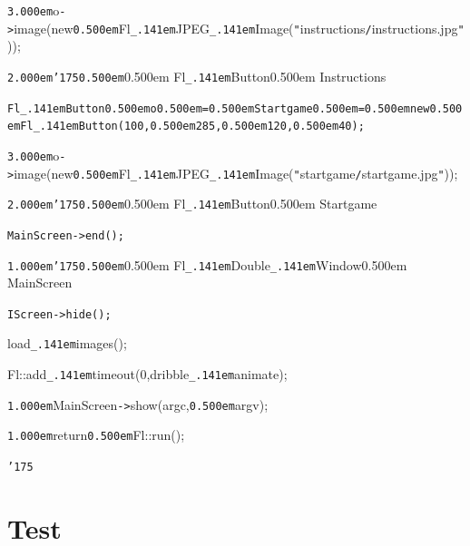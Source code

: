 \documentclass[12pt]{article}
\begin{document}
\noindent
{}{\tt\mc \kern3.000em}o{\tt -}{\tt >}image(new{\tt\mc \kern0.500em}Fl{\tt\_\kern.141em}JPEG{\tt\_\kern.141em}Image({\tt "}instructions{\tt /}instructions.jpg{\tt "}));

\noindent
{}{\tt\mc \kern2.000em}{\tt\char'175}{\tt\mc \kern0.500em}\rm\mc {\tt /}{\tt /}\kern0.500em Fl{\tt\_\kern.141em}Button{\tt *}\kern0.500em Instructions

\noindent
\tt{}Fl{\tt\_\kern.141em}Button{\tt *}{\tt\mc \kern0.500em}o{\tt\mc \kern0.500em}={\tt\mc \kern0.500em}Startgame{\tt\mc \kern0.500em}={\tt\mc \kern0.500em}new{\tt\mc \kern0.500em}Fl{\tt\_\kern.141em}Button(100,{\tt\mc \kern0.500em}285,{\tt\mc \kern0.500em}120,{\tt\mc \kern0.500em}40);

\noindent
{}{\tt\mc \kern3.000em}o{\tt -}{\tt >}image(new{\tt\mc \kern0.500em}Fl{\tt\_\kern.141em}JPEG{\tt\_\kern.141em}Image({\tt "}startgame{\tt /}startgame.jpg{\tt "}));

\noindent
{}{\tt\mc \kern2.000em}{\tt\char'175}{\tt\mc \kern0.500em}\rm\mc {\tt /}{\tt /}\kern0.500em Fl{\tt\_\kern.141em}Button{\tt *}\kern0.500em Startgame

\noindent
\tt\mc {\tt\mc \kern2.000em}MainScreen{\tt -}{\tt >}end();

\noindent
{}{\tt\mc \kern1.000em}{\tt\char'175}{\tt\mc \kern0.500em}\rm\mc {\tt /}{\tt /}\kern0.500em Fl{\tt\_\kern.141em}Double{\tt\_\kern.141em}Window{\tt *}\kern0.500em MainScreen

\noindent
\tt\mc {\tt\mc \kern1.000em}IScreen{\tt -}{\tt >}hide();

\noindent
{}load{\tt\_\kern.141em}images();

\noindent
{}Fl::add{\tt\_\kern.141em}timeout(0,dribble{\tt\_\kern.141em}animate);

\noindent
{}{\tt\mc \kern1.000em}MainScreen{\tt -}{\tt >}show(argc,{\tt\mc \kern0.500em}argv);

\noindent
{}{\tt\mc \kern1.000em}return{\tt\mc \kern0.500em}Fl::run();

\noindent
{}{\tt\char'175}

\noindent
{}\rm\mc {\tt /}{\tt /} \clearpage\section{Test} \rm\mc 
\end{document}
